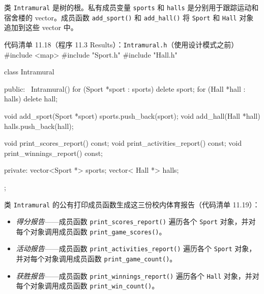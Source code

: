 类 \texttt{Intramural} 是树的根。私有成员变量 \texttt{sports} 和 \texttt{halls} 是分别用于跟踪运动和宿舍楼的 vector。成员函数 \texttt{add\_\allowbreak{}sport(\allowbreak{})\allowbreak{}} 和 \texttt{add\_\allowbreak{}hall(\allowbreak{})\allowbreak{}} 将 \texttt{Sport} 和 \texttt{Hall} 对象追加到这些 vector 中。

\begin{codeboxt}{代码清单 11.18（程序 11.3 Results）：\texttt{Intramural.\allowbreak{}h}（使用设计模式之前）}
#include <map>
#include "Sport.h"
#include "Hall.h"

class Intramural
{
public:
    ~Intramural()
    {
        for (Sport *sport : sports) delete sport;
        for (Hall  *hall  : halls)  delete hall;
    }

    void add_sport(Sport *sport) { sports.push_back(sport); }
    void add_hall(Hall *hall)    { halls.push_back(hall); }

    void print_scores_report() const;
    void print_activities_report() const;
    void print_winnings_report() const;

private:
    vector<Sport *> sports;
    vector< Hall *>  halls;
};
\end{codeboxt}

类 \texttt{Intramural} 的公有打印成员函数生成这三份校内体育报告（代码清单 11.19）：

\begin{itemize}
\item \emph{得分报告}——成员函数 \texttt{print\_\allowbreak{}scores\_\allowbreak{}report(\allowbreak{})\allowbreak{}} 遍历各个 \texttt{Sport} 对象，并对每个对象调用成员函数 \texttt{print\_\allowbreak{}game\_\allowbreak{}scores(\allowbreak{})\allowbreak{}}。
\item \emph{活动报告}——成员函数 \texttt{print\_\allowbreak{}activities\_\allowbreak{}report(\allowbreak{})\allowbreak{}} 遍历各个 \texttt{Sport} 对象，并对每个对象调用成员函数 \texttt{print\_\allowbreak{}game\_\allowbreak{}count(\allowbreak{})\allowbreak{}}。
\item \emph{获胜报告}——成员函数 \texttt{print\_\allowbreak{}winnings\_\allowbreak{}report(\allowbreak{})\allowbreak{}} 遍历各个 \texttt{Hall} 对象，并对每个对象调用成员函数 \texttt{print\_\allowbreak{}win\_\allowbreak{}count(\allowbreak{})\allowbreak{}}。
\end{itemize}

